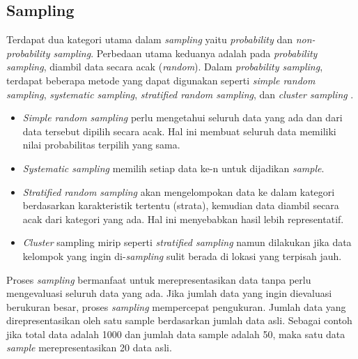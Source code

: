 \subsection{Sampling}
Terdapat dua kategori utama dalam \textit{sampling} yaitu \textit{probability} dan \textit{non-probability sampling}. Perbedaan utama keduanya adalah pada \textit{probability sampling}, diambil data secara acak (\textit{random}). Dalam \textit{probability sampling}, terdapat beberapa metode yang dapat digunakan seperti \textit{simple random sampling}, \textit{systematic sampling}, \textit{stratified random sampling}, dan \textit{cluster sampling} \citep{barreiro2001population}.
\begin{itemize}
  \item \textit{Simple random sampling} perlu mengetahui seluruh data yang ada dan dari data tersebut dipilih secara acak. Hal ini membuat seluruh data memiliki nilai probabilitas terpilih yang sama. 
  \item \textit{Systematic sampling} memilih setiap data ke-n untuk dijadikan \textit{sample}. 
  \item \textit{Stratified random sampling} akan mengelompokan data ke dalam kategori berdasarkan karakteristik tertentu (strata), kemudian data diambil secara acak dari kategori yang ada. Hal ini menyebabkan hasil lebih representatif. 
  \item \textit{Cluster} sampling mirip seperti \textit{stratified sampling} namun dilakukan jika data kelompok yang ingin di-\textit{sampling} sulit berada di lokasi yang terpisah jauh.
\end{itemize}

Proses \textit{sampling} bermanfaat untuk merepresentasikan data tanpa perlu mengevaluasi seluruh data yang ada. Jika jumlah data yang ingin dievaluasi berukuran besar, proses \textit{sampling} mempercepat pengukuran. Jumlah data yang direpresentasikan oleh satu sample berdasarkan jumlah data asli. Sebagai contoh jika total data adalah 1000 dan jumlah data sample adalah 50, maka satu data \textit{sample} merepresentasikan 20 data asli.

